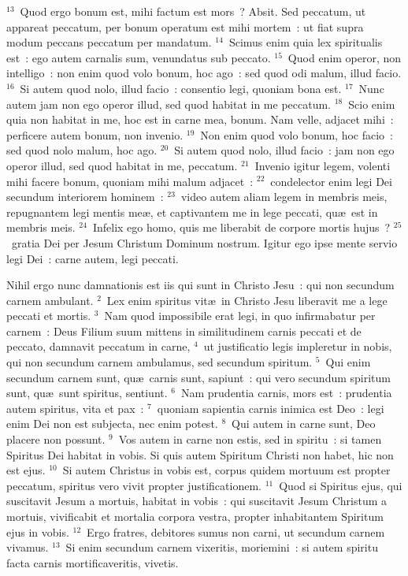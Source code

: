 ${}^{13}$~Quod ergo bonum est, mihi factum est mors~? Absit. Sed peccatum, ut appareat peccatum, per bonum operatum est mihi mortem~: ut fiat supra modum peccans peccatum per mandatum.
${}^{14}$~Scimus enim quia lex spiritualis est~: ego autem carnalis sum, venundatus sub peccato.
${}^{15}$~Quod enim operor, non intelligo~: non enim quod volo bonum, hoc ago~: sed quod odi malum, illud facio.
${}^{16}$~Si autem quod nolo, illud facio~: consentio legi, quoniam bona est.
${}^{17}$~Nunc autem jam non ego operor illud, sed quod habitat in me peccatum.
${}^{18}$~Scio enim quia non habitat in me, hoc est in carne mea, bonum. Nam velle, adjacet mihi~: perficere autem bonum, non invenio.
${}^{19}$~Non enim quod volo bonum, hoc facio~: sed quod nolo malum, hoc ago.
${}^{20}$~Si autem quod nolo, illud facio~: jam non ego operor illud, sed quod habitat in me, peccatum.
${}^{21}$~Invenio igitur legem, volenti mihi facere bonum, quoniam mihi malum adjacet~:
${}^{22}$~condelector enim legi Dei secundum interiorem hominem~:
${}^{23}$~video autem aliam legem in membris meis, repugnantem legi mentis me\ae , et captivantem me in lege peccati, qu\ae\ est in membris meis.
${}^{24}$~Infelix ego homo, quis me liberabit de corpore mortis hujus~?
${}^{25}$~gratia Dei per Jesum Christum Dominum nostrum. Igitur ego ipse mente servio legi Dei~: carne autem, legi peccati.

\lettrine[lines=10,image=true,loversize=0.05,lraise=-0.03]{N}{}ihil ergo nunc damnationis est iis qui sunt in Christo Jesu~: qui non secundum carnem ambulant.
${}^{2}$~Lex enim spiritus vit\ae\ in Christo Jesu liberavit me a lege peccati et mortis.
${}^{3}$~Nam quod impossibile erat legi, in quo infirmabatur per carnem~: Deus Filium suum mittens in similitudinem carnis peccati et de peccato, damnavit peccatum in carne,
${}^{4}$~ut justificatio legis impleretur in nobis, qui non secundum carnem ambulamus, sed secundum spiritum.
${}^{5}$~Qui enim secundum carnem sunt, qu\ae\ carnis sunt, sapiunt~: qui vero secundum spiritum sunt, qu\ae\ sunt spiritus, sentiunt.
${}^{6}$~Nam prudentia carnis, mors est~: prudentia autem spiritus, vita et pax~:
${}^{7}$~quoniam sapientia carnis inimica est Deo~: legi enim Dei non est subjecta, nec enim potest.
${}^{8}$~Qui autem in carne sunt, Deo placere non possunt.
${}^{9}$~Vos autem in carne non estis, sed in spiritu~: si tamen Spiritus Dei habitat in vobis. Si quis autem Spiritum Christi non habet, hic non est ejus.
${}^{10}$~Si autem Christus in vobis est, corpus quidem mortuum est propter peccatum, spiritus vero vivit propter justificationem.
${}^{11}$~Quod si Spiritus ejus, qui suscitavit Jesum a mortuis, habitat in vobis~: qui suscitavit Jesum Christum a mortuis, vivificabit et mortalia corpora vestra, propter inhabitantem Spiritum ejus in vobis.
${}^{12}$~Ergo fratres, debitores sumus non carni, ut secundum carnem vivamus.
${}^{13}$~Si enim secundum carnem vixeritis, moriemini~: si autem spiritu facta carnis mortificaveritis, vivetis.



